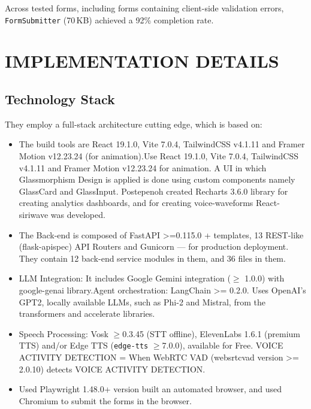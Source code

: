 \documentclass[conference]{IEEEtran}
\begin{document}
Across tested forms, including forms containing client-side validation errors,
\texttt{FormSubmitter} (70\,KB) achieved a 92\% completion rate.

\section{IMPLEMENTATION DETAILS}

\subsection{Technology Stack}

They employ a full-stack architecture cutting edge, which is based on:

\begin{itemize}

    \item The build tools are React 19.1.0, Vite 7.0.4, TailwindCSS v4.1.11 and Framer Motion v12.23.24 (for animation).Use React 19.1.0, Vite 7.0.4, TailwindCSS v4.1.11 and Framer Motion v12.23.24 for animation. A UI in which Glassmorphism Design is applied is done using custom components namely GlassCard and GlassInput. Postepenoh created Recharts 3.6.0 library for creating analytics dashboards, and for creating voice-waveforms React-siriwave was developed.

    \item The Back-end is composed of FastAPI >=0.115.0 + templates, 13 REST-like (flask-apispec) API Routers and Gunicorn — for production deployment. They contain 12 back-end service modules in them, and 36 files in them.

    \item LLM Integration: It includes Google Gemini integration ($\geq$ 1.0.0) with google-genai library.Agent orchestration: LangChain >= 0.2.0. Uses OpenAI's GPT2, locally available LLMs, such as Phi-2 and Mistral, from the transformers and accelerate libraries.

    \item Speech Processing: Vosk $\geq$0.3.45 (STT offline), ElevenLabs 1.6.1 (premium TTS) and/or Edge TTS (\texttt{edge-tts} $\geq$7.0.0), available for Free. VOICE ACTIVITY DETECTION = When WebRTC VAD (websrtcvad version >= 2.0.10) detects VOICE ACTIVITY DETECTION.

    \item Used Playwright 1.48.0+ version built an automated browser, and used Chromium to submit the forms in the browser.


\end{itemize}
\end{document}
